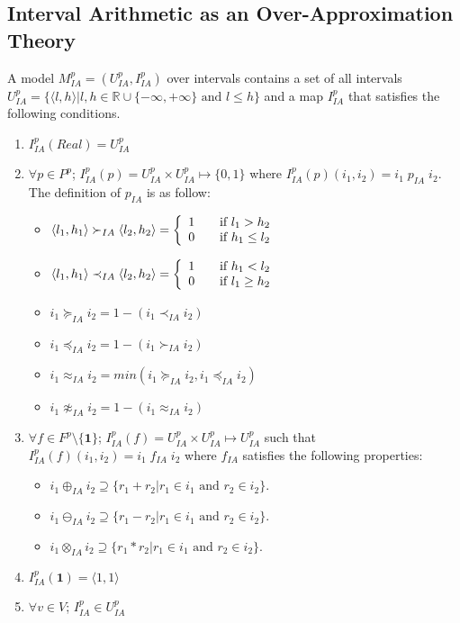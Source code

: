 \subsection{Interval Arithmetic as an Over-Approximation Theory}
A model $M^p_{IA} = (U^p_{IA}, I^p_{IA})$ over intervals contains a set of all intervals $U^p_{IA} = \{\langle l, h\rangle | l, h \in \mathbb{R} \cup \{-\infty, +\infty\} \text{ and } l \le h\}$ and a map $I^p_{IA}$ that satisfies the following conditions.
\begin{enumerate}
\item $I^p_{IA}(Real) = U^p_{IA}$
\item $\forall p \in P^p$; $I^p_{IA}(p)= U^p_{IA} \times U^p_{IA} \mapsto \{0, 1\}$ where $I^p_{IA}(p)(i_1, i_2) = i_1 \; p_{IA} \; i_2$. The definition of $ p_{IA}$ is as follow:
\begin{itemize}
\item $\langle l_1, h_1\rangle  \succ_{IA} \langle l_2,  h_2\rangle  = \left\{ 
  \begin{array}{c l}
    1 & \quad \text{if } l_1 > h_2\\
    0 & \quad \text{if } h_1 \le l_2 \\
  \end{array} \right.$
\item $\langle l_1, h_1\rangle  \prec_{IA} \langle l_2,  h_2\rangle  = \left\{ 
  \begin{array}{c l}
    1 & \quad \text{if } h_1 < l_2\\
    0 & \quad \text{if } l_1 \ge h_2 \\
  \end{array} \right.$
\item $i_1 \succeq_{IA} i_2 = 1 - (i_1 \prec_{IA} i_2)$
\item $i_1 \preceq_{IA} i_2 = 1 - (i_1 \succ_{IA} i_2)$
\item $i_1 \approx_{IA} i_2 = min (i_1 \succeq_{IA} i_2, i_1 \preceq_{IA} i_2)$
\item $i_1 \not\approx_{IA} i_2 = 1 - (i_1 \approx_{IA} i_2)$
\end{itemize}
\item $\forall f \in F^p \setminus \{\mathbf{1}\}$; $I^p_{IA}(f) = U^p_{IA} \times U^p_{IA} \mapsto U^p_{IA}$ such that $ I^p_{IA}(f)(i_1, i_2)= i_1 \; f_{IA} \; i_2$ where $f_{IA}$ satisfies the following properties:
\begin{itemize}
\item $i_1 \oplus_{IA} i_2 \supseteq \{r_1 + r_2| r_1 \in i_1 \text{ and } r_2 \in i_2\}$.
\item $i_1 \ominus_{IA} i_2 \supseteq \{r_1 - r_2| r_1 \in i_1 \text{ and } r_2 \in i_2\}$.
\item $i_1 \otimes_{IA} i_2 \supseteq \{r_1 * r_2| r_1 \in i_1 \text{ and } r_2 \in i_2\}$.
\end{itemize}
\item $I^p_{IA}(\mathbf{1}) = \langle 1,1\rangle $
\item $\forall v \in V$; $I^p_{IA} \in U^p_{IA}$
\end{enumerate}
